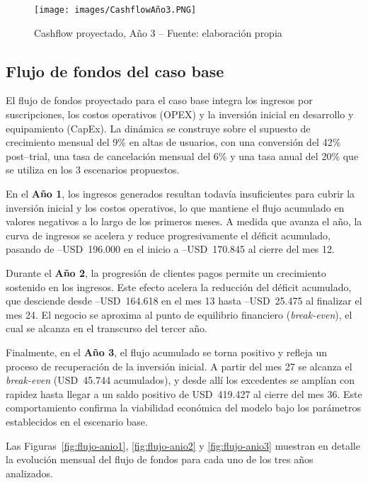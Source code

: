 \begin{figure}[!htbp]
  \centering
  \texttt{[image: images/CashflowAño3.PNG]}
  \caption{Cashflow proyectado, Año 3 -- Fuente: elaboración propia}
  \label{fig:cashflow-anio3}
\end{figure}


\subsection{Flujo de fondos del caso base}

El flujo de fondos proyectado para el caso base integra los ingresos por suscripciones, los costos operativos (OPEX) y la inversión inicial en desarrollo y equipamiento (CapEx). La dinámica se construye sobre el supuesto de crecimiento mensual del 9\% en altas de usuarios, con una conversión del 42\% post--trial, una tasa de cancelación mensual del 6\% y una tasa anual del 20\% que se utiliza en los 3 escenarios propuestos. 

En el \textbf{Año 1}, los ingresos generados resultan todavía insuficientes para cubrir la inversión inicial y los costos operativos, lo que mantiene el flujo acumulado en valores negativos a lo largo de los primeros meses. A medida que avanza el año, la curva de ingresos se acelera y reduce progresivamente el déficit acumulado, pasando de --USD~196.000 en el inicio a --USD~170.845 al cierre del mes 12.  

Durante el \textbf{Año 2}, la progresión de clientes pagos permite un crecimiento sostenido en los ingresos. Este efecto acelera la reducción del déficit acumulado, que desciende desde --USD~164.618 en el mes 13 hasta --USD~25.475 al finalizar el mes 24. El negocio se aproxima al punto de equilibrio financiero (\textit{break-even}), el cual se alcanza en el transcurso del tercer año.  

Finalmente, en el \textbf{Año 3}, el flujo acumulado se torna positivo y refleja un proceso de recuperación de la inversión inicial. A partir del mes 27 se alcanza el \textit{break-even} (USD~45.744 acumulados), y desde allí los excedentes se amplían con rapidez hasta llegar a un saldo positivo de USD~419.427 al cierre del mes 36. Este comportamiento confirma la viabilidad económica del modelo bajo los parámetros establecidos en el escenario base.  

Las Figuras~\ref{fig:flujo-anio1}, \ref{fig:flujo-anio2} y \ref{fig:flujo-anio3} muestran en detalle la evolución mensual del flujo de fondos para cada uno de los tres años analizados.

